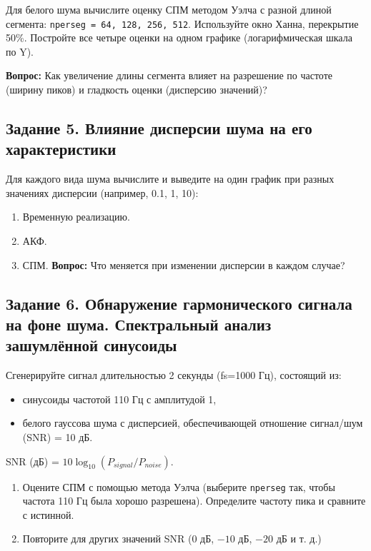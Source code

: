 \documentclass[12pt,a4paper,openany]{book}
\providecommand{\tightlist}{\setlength{\itemsep}{0pt}\setlength{\parskip}{0pt}}
\begin{document}
Для белого шума вычислите оценку СПМ методом Уэлча с разной длиной сегмента: \texttt{nperseg\ =\allowbreak{}\ 64,\allowbreak{}\ 128,\allowbreak{}\ 256,\allowbreak{}\ 512}. Используйте окно Ханна, перекрытие 50\%. Постройте все четыре оценки на одном графике (логарифмическая шкала по Y).

\textbf{Вопрос:} Как увеличение длины сегмента влияет на разрешение по частоте (ширину пиков) и гладкость оценки (дисперсию значений)?

\subsection*{Задание 5. Влияние дисперсии шума на его характеристики}

Для каждого вида шума вычислите и выведите на один график при разных значениях дисперсии (например, 0.1, 1, 10):

\begin{enumerate}
\def\labelenumi{\arabic{enumi}.}
\tightlist
\item
  Временную реализацию.
\item
  АКФ.
\item
  СПМ.
  \textbf{Вопрос:} Что меняется при изменении дисперсии в каждом случае?
\end{enumerate}

\subsection*{Задание 6. Обнаружение гармонического сигнала на фоне шума. Спектральный анализ зашумлённой синусоиды}

Сгенерируйте сигнал длительностью 2 секунды (fs=1000 Гц), состоящий из:

\begin{itemize}
\tightlist
\item
  синусоиды частотой 110 Гц с амплитудой 1,
\item
  белого гауссова шума с дисперсией, обеспечивающей отношение сигнал/шум (SNR) = 10 дБ.
\end{itemize}

SNR (дБ) = \(10 \log_{10}(P_{signal}/P_{noise})\).

\begin{enumerate}
\def\labelenumi{\arabic{enumi}.}
\tightlist
\item
  Оцените СПМ с помощью метода Уэлча (выберите \texttt{nperseg} так, чтобы частота 110 Гц была хорошо разрешена). Определите частоту пика и сравните с истинной.
\item
  Повторите для других значений SNR (\(0\) дБ, \(-10\) дБ, \(-20\) дБ и т. д.)
\end{enumerate}
\end{document}
